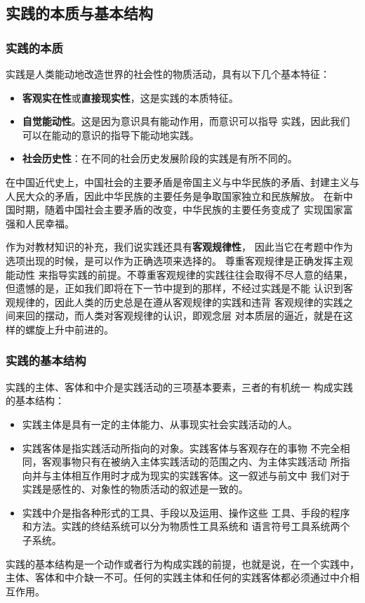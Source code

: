\documentclass[utf-8, 10pt]{article}
\begin{document}
\subsection{实践的本质与基本结构}

\subsubsection{实践的本质}

实践是人类能动地改造世界的社会性的物质活动，具有以下几个基本特征：
\begin{itemize}[itemsep=0pt]
    \item \textbf{客观实在性}或\textbf{直接现实性}，这是实践的本质特征。
    \item \textbf{自觉能动性}。这是因为意识具有能动作用，而意识可以指导
    实践，因此我们可以在能动的意识的指导下能动地实践。
    \item \textbf{社会历史性}：在不同的社会历史发展阶段的实践是有所不同的。
\end{itemize}

\begin{example}
    在中国近代史上，中国社会的主要矛盾是帝国主义与中华民族的矛盾、封建主义与
    人民大众的矛盾，因此中华民族的主要任务是争取国家独立和民族解放。
    在新中国时期，随着中国社会主要矛盾的改变，中华民族的主要任务变成了
    实现国家富强和人民幸福。
\end{example}

{\small 作为对教材知识的补充，我们说实践还具有\textbf{客观规律性}，
因此当它在考题中作为选项出现的时候，是可以作为正确选项来选择的。
尊重客观规律是正确发挥主观能动性
来指导实践的前提。不尊重客观规律的实践往往会取得不尽人意的结果，
但遗憾的是，正如我们即将在下一节中提到的那样，不经过实践是不能
认识到客观规律的，因此人类的历史总是在遵从客观规律的实践和违背
客观规律的实践之间来回的摆动，而人类对客观规律的认识，即观念层
对本质层的逼近，就是在这样的螺旋上升中前进的。}

\subsubsection{实践的基本结构}

实践的主体、客体和中介是实践活动的三项基本要素，三者的有机统一
构成实践的基本结构：
\begin{itemize}[itemsep=0pt]
    \item {\kaishu 实践主体是具有一定的主体能力、从事现实社会实践活动的人}。
    \item {\kaishu 实践客体是指实践活动所指向的对象}。实践客体与客观存在的事物
    不完全相同，客观事物只有在被纳入主体实践活动的范围之内、为主体实践活动
    所指向并与主体相互作用时才成为现实的实践客体。这一叙述与前文中
    我们对于实践是感性的、对象性的物质活动的叙述是一致的。
    \item {\kaishu 实践中介是指各种形式的工具、手段以及运用、操作这些
    工具、手段的程序和方法}。实践的终结系统可以分为物质性工具系统和
    语言符号工具系统两个子系统。
\end{itemize}
实践的基本结构是一个动作或者行为构成实践的前提，也就是说，在一个实践中，
主体、客体和中介缺一不可。任何的实践主体和任何的实践客体都必须通过中介相互作用。
\end{document}
